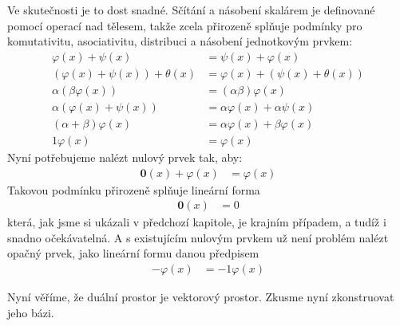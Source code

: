\documentclass[a5paper,12pt]{amsbook}
\theoremstyle{definition}
\newcommand{\myscalar}[1]{#1}
\newcommand{\myvec}[1]{\bm{#1}}
\begin{document}
Ve skutečnosti je to dost snadné. Sčítání a násobení skalárem je definované pomocí operací nad tělesem,
takže zcela přirozeně splňuje podmínky pro komutativitu, asociativitu, distribuci a násobení jednotkovým
prvkem:
\begin{equation*}
\begin{split}
\varphi(x) + \psi(x) &= \psi(x) + \varphi(x)\\
(\varphi(x) + \psi(x)) + \theta(x) &= \varphi(x) + (\psi(x) + \theta(x))\\
\alpha(\beta \varphi(x)) &= (\alpha\beta)\varphi(x)\\
\alpha(\varphi(x) + \psi(x)) &= \alpha\varphi(x) + \alpha\psi(x)\\
(\alpha + \beta)\varphi(x) &= \alpha\varphi(x) + \beta\varphi(x)\\
\myscalar{1}\varphi(x) &= \varphi(x)
\end{split}
\end{equation*}
Nyní potřebujeme nalézt nulový prvek tak, aby:
\begin{equation*}
\begin{split}
\myvec{0}(x) + \varphi(x) &= \varphi(x)
\end{split}
\end{equation*}
Takovou podmínku přirozeně splňuje lineární forma
\begin{equation*}
\begin{split}
\myvec{0}(x) &= \myscalar{0}
\end{split}
\end{equation*}
která, jak jsme si ukázali v předchozí kapitole, je krajním případem, a tudíž i snadno očekávatelná.
A s existujícím nulovým prvkem už není problém nalézt opačný prvek, jako lineární formu danou předpisem
\begin{equation*}
\begin{split}
-\varphi(x) &= \myscalar{-1}\varphi(x)
\end{split}
\end{equation*}

Nyní věříme, že duální prostor je vektorový prostor. Zkusme nyní zkonstruovat jeho bázi.
\end{document}
